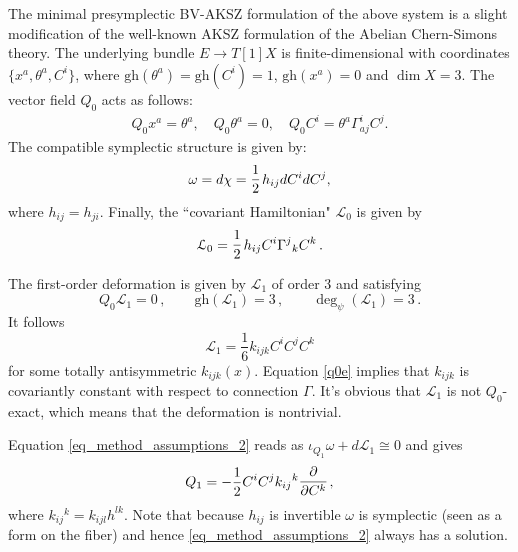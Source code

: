 \documentclass[a4paper,12pt]{article}
\numberwithin{equation}{section} %
\renewcommand{\simeq}{\cong}
\newcommand{\gh}[1]{\mathrm{gh}(#1)}
\renewcommand{\d}{\partial}
\newcommand{\half}{\mathchoice{%
    \ffrac{1}{2}}{\frac{1}{2}}{\frac{1}{2}}{\frac{1}{2}}}
\newcommand{\ffrac}[2]{\raisebox{.5pt}%
  {\footnotesize$\displaystyle\frac{#1}{#2}$}\kern1pt}
\newcommand{\dl}[1]{\mathchoice{\ffrac{\d}{\d #1}}{\frac{\d}{\d #1}}{\ffrac{\d}{\d #1}}{\ffrac{\d}{\d #1}}}
\def\cL{\mathcal{L}}
\newcommand{\h}{\cL}
\begin{document}
The minimal presymplectic BV-AKSZ formulation of the above system is a slight modification of the well-known AKSZ formulation of the Abelian Chern-Simons theory. The underlying bundle $E\rightarrow T[1]X$ is finite-dimensional with coordinates $ \{ x^a, \theta^a, C^i \} $, where $ \gh{\theta^a} = \gh{C^i} = 1 $, $ \gh{x^a} = 0 $ and $ \dim X = 3 $. The vector field $Q_0$ acts as follows:
\begin{align}
	Q_0 x^a = \theta^a, \quad Q_0 \theta^a = 0, \quad Q_0 C^i = \theta^a \Gamma^i_{aj} C^j.
\end{align}
The compatible symplectic structure is given by:
\begin{equation}
	\omega = d \chi = \half h_{ij}dC^i dC^j,
\end{equation}
where $h_{ij} = h_{ji}$. Finally, the ``covariant Hamiltonian" $\cL_0$ is given by 
\begin{equation}
\cL_0=\half h_{ij} C^i\Gamma^j{}_k C^k\,.
\end{equation}


The first-order deformation is given by $\cL_1$ of order $3$ and satisfying 
\begin{equation}
\label{q0e}
	Q_0 \h_1 = 0\,, \qquad \gh{\h_1}=3\,, \qquad \deg_\psi(\h_1)=3\,.
\end{equation}
It follows 
\begin{equation}
	\h_1 = \frac{1}{6}k_{ijk} C^i C^j C^k
\end{equation}
for some  totally antisymmetric $k_{ijk}(x)$. Equation \eqref{q0e} implies that $k_{ijk}$ is covariantly constant with respect to connection $\Gamma$. It's obvious that $ \h_1 $ is not $Q_0$-exact, which means that the deformation is nontrivial. 

Equation \eqref{eq_method_assumptions_2} reads as $\iota_{Q_1} \omega + d \h_1 \simeq 0$
and gives 
\begin{equation}
	Q_1 = -\frac{1}{2} C^i C^j k_{ij}{}^k \dl{C^k},
\end{equation}
where $k_{ij}{}^k = k_{ijl}h^{lk}$. Note that because $h_{ij}$ is invertible $\omega$ is symplectic (seen as a form on the fiber) and hence \eqref{eq_method_assumptions_2} always has a solution. 
\end{document}
